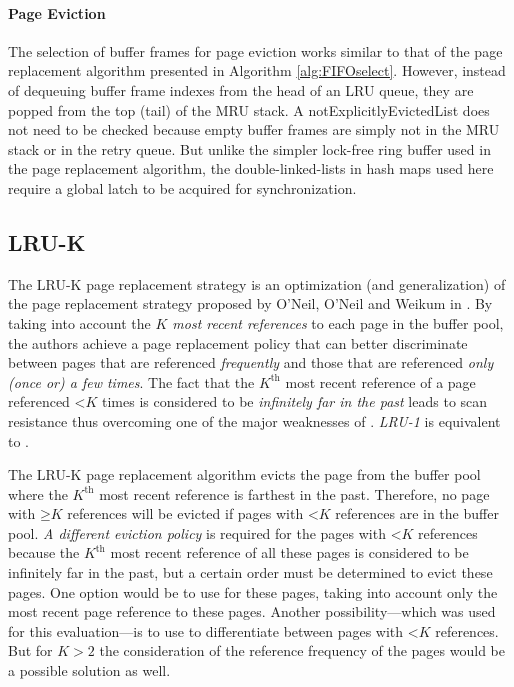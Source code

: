 \paragraph{Page Eviction}

    The selection of buffer frames for page eviction works similar to that of the  page replacement algorithm presented in Algorithm \ref{alg:FIFOselect}. However, instead of dequeuing buffer frame indexes from the head of an LRU queue, they are popped from the top (tail) of the MRU stack. A notExplicitlyEvictedList does not need to be checked because empty buffer frames are simply not in the MRU stack or in the retry queue. But unlike the simpler lock-free ring buffer used in the  page replacement algorithm, the double-linked-lists in hash maps used here require a global latch to be acquired for synchronization.

\subsection{LRU-K} \label{subsec:lru-k}

    The LRU-K page replacement strategy is an optimization (and generalization) of the  page replacement strategy proposed by O'Neil, O'Neil and Weikum in \cite{ONeil:1993}. By taking into account the \emph{$K$ most recent references} to each page in the buffer pool, the authors achieve a page replacement policy that can better discriminate between pages that are referenced \emph{frequently} and those that are referenced \emph{only (once or) a few times}. The fact that the $K^{\text{th}}$ most recent reference of a page referenced $\mathord{<} K$ times is considered to be \emph{infinitely far in the past} leads to scan resistance thus overcoming one of the major weaknesses of . \emph{LRU-1} is equivalent to .

    The LRU-K page replacement algorithm evicts the page from the buffer pool where the $K^{\text{th}}$ most recent reference is farthest in the past. Therefore, no page with $\mathord{\geq} K$ references will be evicted if pages with $\mathord{<} K$ references are in the buffer pool. \emph{A different eviction policy} is required for the pages with $\mathord{<} K$ references because the $K^{\text{th}}$ most recent reference of all these pages is considered to be infinitely far in the past, but a certain order must be determined to evict these pages. One option would be to use  for these pages, taking into account only the most recent page reference to these pages. Another possibility---which was used for this evaluation---is to use  to differentiate between pages with $\mathord{<} K$ references. But for $K > 2$ the consideration of the reference frequency of the pages would be a possible solution as well.
    
